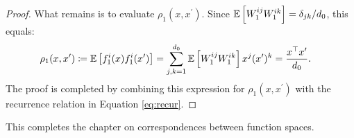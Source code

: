 \begin{refsection}
\begin{proof}
    What remains is to evaluate $\rho_1(x,x^\prime)$. Since $\operatorname{\mathbb{E}}\left[W_1^{ij}W_1^{ik}\right] = \delta_{jk}/d_0$, this equals:
    \begin{align*}
        \rho_1(x,x^\prime) &\coloneqq  \operatorname{\mathbb{E}} \left[ f_1^i(x) f_1^i(x^\prime)\right] = \sum_{j,k=1}^{d_0} \operatorname{\mathbb{E}}\left[W_1^{ij}W_1^{ik}\right] x^j (x^\prime)^k = \frac{x^\top x^\prime}{d_0}.
    \end{align*}
    The proof is completed by combining this expression for $\rho_1(x,x^\prime)$ with the recurrence relation in Equation \ref{eq:recur}.
\end{proof}

This completes the chapter on correspondences between function spaces.

\printbibliography[heading=subbibliography]
\end{refsection}